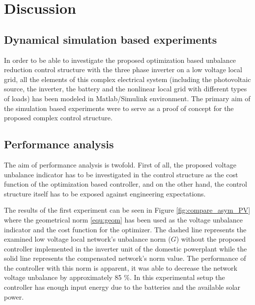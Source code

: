 \section{Discussion}

    \subsection{Dynamical simulation based experiments}

    In order to be able to investigate the proposed optimization based unbalance reduction control structure with the three phase inverter on a low voltage local grid, all the elements of this complex electrical system (including the photovoltaic source, the inverter, the battery and the nonlinear local grid with different types of loads) has been modeled in Matlab/Simulink environment. The primary aim of the simulation based experiments were to serve as a proof of concept for the proposed complex control structure.

    \subsection{Performance analysis}

    The aim of performance analysis is twofold. First of all, the proposed voltage unbalance indicator has to be investigated in the control structure as the cost function of the optimization based controller, and on the other hand, the control structure itself has to be exposed against engineering expectations.


            The results of the first experiment can be seen in Figure \ref{fig:compare_asym_PV} where the geometrical norm \ref{equ:geom} has been used as the voltage unbalance indicator and the cost function for the optimizer.  The dashed line represents the examined low voltage local network's unbalance norm ($G$) without the proposed controller implemented in the inverter unit of the domestic powerplant while the solid line represents the compensated network's norm value. The performance of the controller with this norm is apparent, it was able to decrease the network voltage unbalance by approximately 85 \%. In this experimental setup the controller has enough input energy due to the batteries and the available solar power.

